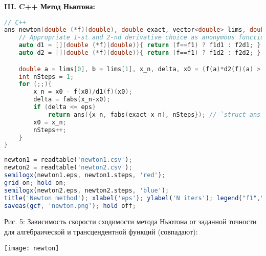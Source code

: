 \newpage

{\large\bf{III. C++ Метод Ньютона:}}
\begin{lstlisting}[language=c++, firstnumber=21]
// C++
ans newton(double (*f)(double), double exact, vector<double> lims, double eps){
    // Appropriate 1-st and 2-nd derivative choice as anonymous functions
    auto d1 = [](double (*f)(double)){ return (f==f1) ? f1d1 : f2d1; };
    auto d2 = [](double (*f)(double)){ return (f==f1) ? f1d2 : f2d2; };

    double a = lims[0], b = lims[1], x_n, delta, x0 = (f(a)*d2(f)(a) > 0) ? a : b;
    int nSteps = 1;
    for (;;){
        x_n = x0 - f(x0)/d1(f)(x0);
        delta = fabs(x_n-x0);
        if (delta <= eps)
            return ans({x_n, fabs(exact-x_n), nSteps}); // `struct ans` defined below
        x0 = x_n;
        nSteps++;
    }
}
\end{lstlisting}
\begin{lstlisting}[language=Octave, firstnumber=40]
% Matlab
newton1 = readtable('newton1.csv');
newton2 = readtable('newton2.csv');
semilogx(newton1.eps, newton1.steps, 'red');
grid on; hold on;
semilogx(newton2.eps, newton2.steps, 'blue');
title('Newton method'); xlabel('eps'); ylabel('N iters'); legend("f1","f2");
saveas(gcf, 'newton.png'); hold off;
\end{lstlisting}
Рис. 5: Зависимость скорости сходимости метода Ньютона от заданной точности для алгебраической и трансцендентной функций (совпадают):
\begin{center}
    \texttt{[image: newton]}
\end{center}

\newpage

